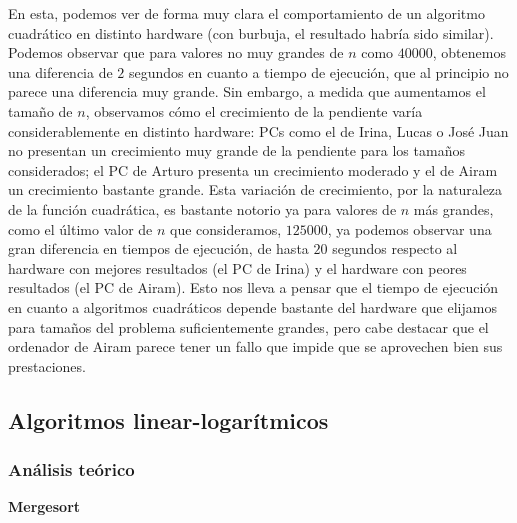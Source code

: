 \documentclass[12pt]{article}
\begin{document}
    En esta, podemos ver de forma muy clara el comportamiento de un algoritmo cuadrático en distinto hardware (con burbuja, el resultado habría sido similar). Podemos observar que para valores no muy grandes de $n$ como $40000$, obtenemos una diferencia de $2$ segundos en cuanto a tiempo de ejecución, que al principio no parece una diferencia muy grande. Sin embargo, a medida que aumentamos el tamaño de $n$, observamos cómo el crecimiento de la pendiente varía considerablemente en distinto hardware: PCs como el de Irina, Lucas o José Juan no presentan un crecimiento muy grande de la pendiente para los tamaños considerados; el PC de Arturo presenta un crecimiento moderado y el de Airam un crecimiento bastante grande. Esta variación de crecimiento, por la naturaleza de la función cuadrática, es bastante notorio ya para valores de $n$ más grandes, como el último valor de $n$ que consideramos, $125000$, ya podemos observar una gran diferencia en tiempos de ejecución, de hasta $20$ segundos respecto al hardware con mejores resultados (el PC de Irina) y el hardware con peores resultados (el PC de Airam). Esto nos lleva a pensar que el tiempo de ejecución en cuanto a algoritmos cuadráticos depende bastante del hardware que elijamos para tamaños del problema suficientemente grandes, pero cabe destacar que el ordenador de Airam parece tener un fallo que impide que se aprovechen bien sus prestaciones.
    
    \subsection{Algoritmos linear-logarítmicos}
    \subsubsection{Análisis teórico}
    \textbf{Mergesort}
    
\end{document}
